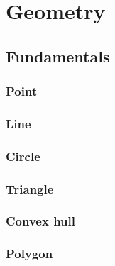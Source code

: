 \section{Geometry}

\subsection{Fundamentals}
\subsubsection{Point}

\subsubsection{Line}

\subsubsection{Circle}

\subsubsection{Triangle}

\subsubsection{Convex hull}

\subsubsection{Polygon}

